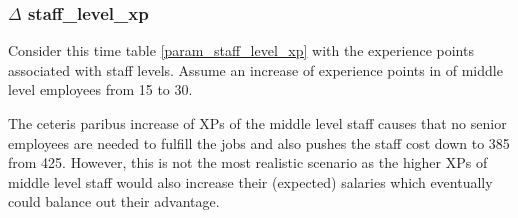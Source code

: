     \subsubsection{$\Delta$ staff\_level\_xp}
    Consider this time table \ref{param_staff_level_xp} with the experience points associated with
    staff levels. Assume an increase of experience points in of middle level employees from 15 to 30.
            
    The ceteris paribus increase of XPs of the middle level staff causes that no senior employees are
    needed to fulfill the jobs and also pushes the staff cost down to 385 from 425. However, this is
    not the most realistic scenario as the higher XPs of middle level staff would also increase 
    their (expected) salaries which eventually could balance out their advantage.
